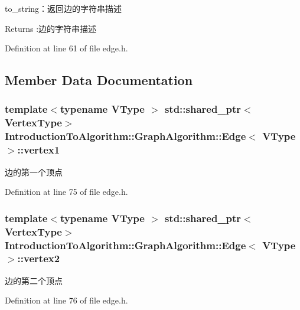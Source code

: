 to\+\_\+string：返回边的字符串描述 

\begin{DoxyReturn}{Returns}
\+:边的字符串描述 
\end{DoxyReturn}


Definition at line 61 of file edge.\+h.



\subsection{Member Data Documentation}
\hypertarget{struct_introduction_to_algorithm_1_1_graph_algorithm_1_1_edge_a634535a3f12be42c3c6ffb6d3c604fb7}{}
\subsubsection[{vertex1}]{\setlength{\rightskip}{0pt plus 5cm}template$<$typename V\+Type $>$ std\+::shared\+\_\+ptr$<${\bf Vertex\+Type}$>$ {\bf Introduction\+To\+Algorithm\+::\+Graph\+Algorithm\+::\+Edge}$<$ V\+Type $>$\+::vertex1}\label{struct_introduction_to_algorithm_1_1_graph_algorithm_1_1_edge_a634535a3f12be42c3c6ffb6d3c604fb7}
边的第一个顶点 

Definition at line 75 of file edge.\+h.

\hypertarget{struct_introduction_to_algorithm_1_1_graph_algorithm_1_1_edge_a762ca9f6ad5abb1adf8b7e1319ea3b52}{}
\subsubsection[{vertex2}]{\setlength{\rightskip}{0pt plus 5cm}template$<$typename V\+Type $>$ std\+::shared\+\_\+ptr$<${\bf Vertex\+Type}$>$ {\bf Introduction\+To\+Algorithm\+::\+Graph\+Algorithm\+::\+Edge}$<$ V\+Type $>$\+::vertex2}\label{struct_introduction_to_algorithm_1_1_graph_algorithm_1_1_edge_a762ca9f6ad5abb1adf8b7e1319ea3b52}
边的第二个顶点 

Definition at line 76 of file edge.\+h.

